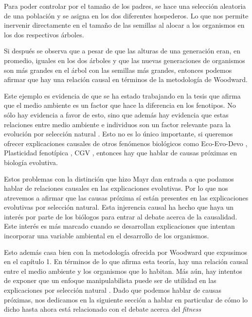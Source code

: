 Para poder controlar por el tamaño de los padres, se hace una selección aleatoria de una población y se asigna en los dos diferentes hospederos. Lo que nos permite inervenir directamente en el tamaño de las semillas al alocar a los organismos en los dos respectivos árboles.

\begin{center}
\end{center}

Si después se observa que a pesar de que las alturas de una generación eran, en promedio, iguales en los dos árboles y que las nuevas generaciones de organismos son más grandes en el árbol con las semillas más grandes, entonces podemos afirmar que hay una relación causal en términos de la metodología de Woodward.

Este ejemplo es evidencia de que se ha estado trabajando en la tesis que afirma que el medio ambiente es un factor que hace la diferencia en los fenotipos. No sólo hay evidencia a favor de esto, sino que además hay evidencia que estas relaciones entre medio ambiente e individuos son un factor relevante para la evolución por selección natural \cite{Jablonka2020, Dayan2020, MacColl2011}. Esto no es lo único importante, si queremos ofrecer explicaciones causales de otros fenómenos biológicos como Eco-Evo-Devo \cite{PfenningEco-Evo-Devo}, Plasticidad fenotípica \cite{WESTEBERHARD20082701}, CGV \cite{CVG}, entonces hay que hablar de causas próximas en biología evolutiva.

Estos problemas con la distinción que hizo Mayr dan entrada a que podamos hablar de relaciones causales en las explicaciones evolutivas. Por lo que nos atrevemos a afirmar que las causas próxima sí están presentes en las explicaciones evolutivas por selección natural. Esta injerencia causal ha hecho que haya un interés por parte de los biólogos para entrar al debate acerca de la causalidad. Este interés es más marcado cuando se desarrollan explicaciones que intentan incorporar una variable ambiental en el desarrollo de los organismos.

Esto además casa bien con la metodología ofrecida por Woodward que expusimos en el capítulo 1. En términos de lo que afirma esta teoría, hay una relación causal entre el medio ambiente y los organismos que lo habitan. Más aún, hay intentos de exponer que un enfoque manipulabilista puede ser de utilidad en las explicaciones por selección natural \cite{MacColl2011}. Dado que podemos hablar de causas próximas, nos dedicamos en la siguiente sección a hablar en particular de cómo lo dicho hasta ahora está relacionado con el debate acerca del \emph{fitness}

